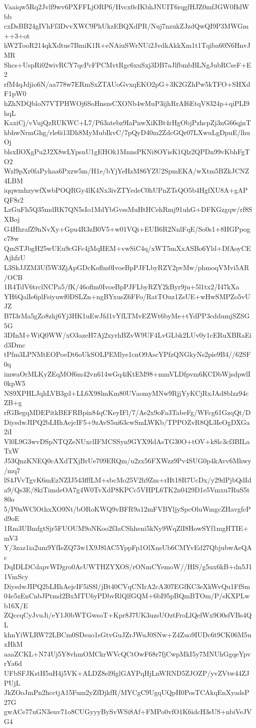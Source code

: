 Vaaiqw5Rq2Jvlf9wv6PXFFLjORP6/Hvcx0cIKbhJNUIT6rqgfHJZ0mfJGW0BdWbb
cxDsBB24gIVhFf3DvvXWC9PhUkzEBQXdPR/Nuj7nzukZJzdQwQI9P3MWGm++3+ot
hW2TooR214qkXdtue7BmiK1R+eNAiuSWrNUi2JvdkAkkXm1t1Tqiba60N6HnvJMR
Shcs+UspRi02wivRCY7qcPcFPCMvtRgc6xuSxj3DB7aJlfbmbBLNgJubRCseF+E2
rfM4qJdjio6N/aa778w7ERmSxZTAUoGvxqEKO2pG+3K2GZhPw5kTFO+SHXdF1pW0
hZhNDQbloN7VTPHWOj6SoHnszsCXONb4wMuP3ijhRrAI6EtqV8324p+qiPLI9hqL
KaxiCj/vVujQzRUKWC+L7/P63atebz9IaPnwXiKBt4rHgObjPzhcpZj3nG66qjnT
hbhwNrmGhg/rle6i13Dh8MyMubIkvC/7pQyD40m2ZdcGQr07LXwuLgDpuE/lhuOj
blsxIlOXgPu2J2X8wLYpsnU1gEHOk1MnnsPKNi8OYisK1Qlz2QPDn99vKbhFgTO2
Wzl9pXr0faPyhaa6Pxzw5m/H1e/bYjYeHzM86YZU2SpmEKA/wXtm5BZkJCNZ4LBM
iqqwmhzywfXwbPOQRGy4lK4Nx3ivZTYedeC0hUPnZTsQO5b4HgfXU8A+gAPQF8r2
LzGuFh5Q35mdRK7QN5sIo1MdYbGvssMuHtHCehRmj91uhG+DFKGzgqw/rf8SXBoj
G4HhrafZ9nNvXy+Gpu4R3zB0V5+w01VQi+EUB6R2NnlFqE/So0s1+8HGPpogc78w
QmSTJbgH25wUEu9cGFc4jMqHEM+vwSiC4q/xWT5mXxASBo6Yld+DfAoyCEAjhfzU
L3SkJJZM3Uf5W3ZjApGDcKoflm0IvoeBpPJFLbyRZY2pvMw/phmoqVMvi5AR/OCB
1R4TdV6trclNCPa5/fK/46oflm0IvoeBpPJFLbyRZY2kByr9ju+5l1tx2/I47kXa
YH6QalIe6plFsiyuwf0DSLZn+ngBYxusZ6FFo/RatTOuz1ZsUE+wHwSMPZo5vUJZ
B7I3rMa5gZo8zhj6Yj3HK1uEwJfd1vYfLTMvEZWt6byMe+tYdPP3cddumjSZSG5G
3DInM+WiQ0WW/xO3azeH7Aj2xyrhBZvW9UF4LvGLbk2LUv0y1cERuXBRaEid3Dmc
tPfm3LPNMtEOPoeDt6oUkSOLPEMlye1cnO9AscYPfzQNGkyNs2pie9B4//62SF0q
imwaOrMLKyZEqMOf6m42vn614wGq4iKtEM98+mmVLDfpvm6KCDbWjsdpwlI0kpW5
NS9XPHLJqhLVB3gd+LL6X98lmKm80UVaomyMNw9RjjYyKCjRxJAd8blzz94cZB+g
rfGBegqMDEPitkBEFRBpin84qCKeyIFl/7/Ae2x9oFa3TabeFg/WFcg61GzqQt/D
DiysdwJIPQ2bLHhAejcIF5+9zAvS5ui63cwSmLWKb/TPPOZvR8QL3IeOgDXGa2iI
Vl0L9G3wvDSpNTQZeNUxclIFMCSSyn9GYX9ldAsTG30O+tOV+k8lc3cf3BILaTxW
J53QnzKNEQ0cAXdTXjBrUe709ERQm/u2zx56FXWzz9Pv4SUG0p4kAvv6Mhwy/mq7
lS4JVvTgvK6mEzNZIJ543fffLM+sbcMo25V2h9Zm+rHt18R7UcDx/y29dPjbQdId
a9/Qs3E/8kiTimdeOA7g4W0TvXdP8KPCc5VHPL6TK2n0429D1e5Vmxu7RuS5t80o
5/P0nWClOthxXO9Nt/bORoKWQ9vBFR9a12mFVBYljySpcOluWmgcZHavgfcPd9oE
1Rm3UBmfgtSjr5FUOUM9oNKoo2f3aCShheni5kNy9WqZlI8HowSYf1mgHTIE+mV3
Y/3zaz1ia2um9YfIeZQ73w1X9J8lAC5YppFp1OlXnsUb6CMYvEd27QbjubwAeQAc
DqIDLDCdapvWDgro0AcUWTHZYXOS/rONmCYemoW//HIS/g5ux6kB+dn5J11VmScy
DiysdwJIPQ2bLHhAejcIF5iS8l/jBt40CVqCNIrA2cA307EGfKC3eXkWvQu1FfSm
04e5zEnCnbJPtmd2BxMTU6yPDbvRlQlfGQM+6bI95pBQmBTOm/P/sKXPLwb16X/E
ZQccqCyJvuJi/eY1J0bWTGwsoT+Kpr8J7UK3uzsUOztFroLlQefWx9O0sfVBs4QL
khnYiWLRW72LBCm0SDsuo1sGtvGuJZrJWuJ0SNw+Z4Zuo9IUDc6t9CK06M5uxHkM
aaaZCKL+N74Uj5Y8vhmOMCkrWVcQCtOwF68r7fjCwpMkI5y7MNUhGgqeYpvrYa6d
UFbSFJKstH5uH4j5VK+ALDZ8el9lglGAYPqHjLnWRND5ZJOZP/yvZVtw44ZJPUjL
JkZOoJmPn2hcctjA15Fum2yZfDjkfR/MYCgC9UgqUQpH0PosTCAkqEnXyadsP27G
gwACe77uGN3euv71o8CUGyyyBySvWSi8Af+FMPo0vfO1K6idcH3sUS+nbiVeJVG4
